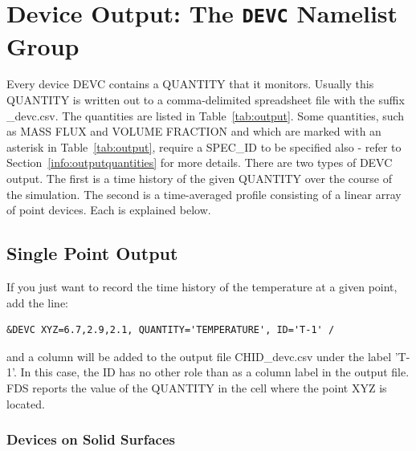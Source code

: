 \documentclass[11pt]{book}
\begin{document}
\section{Device Output: The \texorpdfstring{{\tt DEVC}}{DEVC} Namelist Group}

Every device {\ct DEVC} contains a {\ct QUANTITY} that it monitors. Usually this {\ct QUANTITY} is written out to a comma-delimited spreadsheet file with the suffix {\ct \_devc.csv}. The quantities are listed in Table~\ref{tab:output}. Some quantities, such as {\ct MASS FLUX} and {\ct VOLUME FRACTION} and which are marked with an asterisk in Table~\ref{tab:output}, require a {\ct SPEC\_ID} to be specified also - refer to Section~\ref{info:outputquantities} for more details. There are two types of {\ct DEVC} output. The first is a time history of the given {\ct QUANTITY} over the course of the simulation. The second is a time-averaged profile consisting of a linear array of point devices. Each is explained below.

\subsection{Single Point Output}

If you just want to record the time history of the temperature at a given point, add the line:
\begin{lstlisting}
&DEVC XYZ=6.7,2.9,2.1, QUANTITY='TEMPERATURE', ID='T-1' /
\end{lstlisting}
and a column will be added to the output file {\ct CHID\_devc.csv} under the label {\ct 'T-1'}. In this case, the {\ct ID} has no other role than as a column label in the output file. FDS reports the value of the {\ct QUANTITY} in the cell where the point {\ct XYZ} is located.

\subsubsection{Devices on Solid Surfaces}
\end{document}
